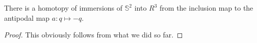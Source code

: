 %

\begin{Theorem}[Smale 1958]
    \label{thm:sphere_eversion}
    \leanok
    There is a homotopy of immersions of $\mathbb S^2$ into $R^3$ from the inclusion map to
    the antipodal map $a : q \mapsto -q$.
  \end{Theorem}
    
  \begin{proof}
    \leanok
    This obviously follows from what we did so far.
  \end{proof}